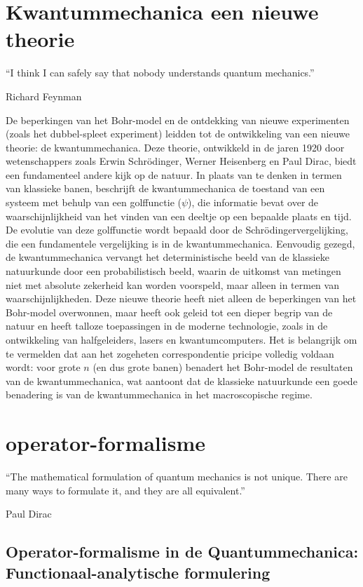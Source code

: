 \documentclass{report} %
\begin{document}
    \chapter{Kwantummechanica een nieuwe theorie}
    \epigraph{“I think I can safely say that nobody understands quantum mechanics.”}{Richard Feynman}
    De beperkingen van het Bohr-model en de ontdekking van nieuwe experimenten (zoals het dubbel-spleet experiment) leidden tot de ontwikkeling van een nieuwe theorie: de kwantummechanica.
    Deze theorie, ontwikkeld in de jaren 1920 door wetenschappers zoals Erwin Schrödinger, Werner Heisenberg en Paul Dirac, biedt een fundamenteel andere kijk op de natuur.
    In plaats van te denken in termen van klassieke banen, beschrijft de kwantummechanica de toestand van een systeem met behulp van een golffunctie ($\psi$), die informatie bevat over de waarschijnlijkheid van het vinden
    van een deeltje op een bepaalde plaats en tijd. De evolutie van deze golffunctie wordt bepaald door de Schrödingervergelijking, die een fundamentele vergelijking is in de kwantummechanica.
    Eenvoudig gezegd, de kwantummechanica vervangt het deterministische beeld van de klassieke natuurkunde door een probabilistisch beeld, waarin de uitkomst van metingen niet met absolute zekerheid kan worden voorspeld, maar alleen in termen van waarschijnlijkheden.
    Deze nieuwe theorie heeft niet alleen de beperkingen van het Bohr-model overwonnen, maar heeft ook geleid tot een dieper begrip van de natuur en heeft talloze toepassingen in de moderne technologie, zoals in de ontwikkeling van halfgeleiders, lasers en kwantumcomputers.
    Het is belangrijk om te vermelden dat aan het zogeheten correspondentie pricipe volledig voldaan wordt: voor grote $n$ (en dus grote banen) benadert het Bohr-model de resultaten van de kwantummechanica,
    wat aantoont dat de klassieke natuurkunde een goede benadering is van de kwantummechanica in het macroscopische regime.


    \chapter{operator-formalisme}
    \epigraph{“The mathematical formulation of quantum mechanics is not unique. There are many ways to formulate it, and they are all equivalent.”}{Paul Dirac}


    \section{Operator-formalisme in de Quantummechanica:
    Functionaal-analytische formulering}
\end{document}
